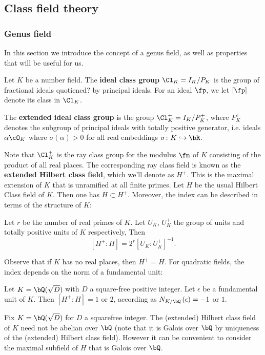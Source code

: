 \subsection{Class field theory}
\subsubsection{Genus field}

In this section we introduce the concept of a genus field, as well as properties that will be useful for us.

Let $K$ be a number field. The \textbf{ideal class group} $\Cl_K = I_K / P_K$ is the group of fractional ideals quotiened{\color{red}?} by principal ideals.
For an ideal $\fp$, we let $[\fp]$ denote its class in $\Cl_K$.

The \textbf{extended ideal class group} is the group $\Cl_K^{+} = I_K / P_K^{+}$, where
$P_K^{+}$ denotes the subgroup of principal ideals with totally positive generator, i.e. ideals $\alpha \cO_K$ where $\sigma(\alpha) > 0$ for all real embeddings $\sigma \colon K \emb \bR$.

Note that $\Cl_K^{+}$ is the ray class group for the modulus $\fm$ of $K$ consisting of the product of all real places. The corresponding ray class field is known as the \textbf{extended Hilbert class field}, which we'll denote as $H^{+}$. This is the maximal extension of $K$ that is unramified at all finite primes. Let $H$ be the usual Hilbert Class field of $K$. Then one has $H \subset H^{+}$. Moreover, the index can be described in terms of the structure of $K$:

\begin{thm}\cite[Chapter VI, Section 3, Theorem 3.1]{Janusz}
    Let $r$ be the number of real primes of $K$. Let $U_K$, $U_K^{+}$ the group of units and totally positive units of $K$ respectively, Then 
    \[ [H^{+} \colon H] = 2^r [U_K \colon U_K^{+}]^{-1} .\]
\end{thm}
Observe that if $K$ has no real places, then $H^{+} = H$. For quadratic fields, the index depends on the norm of a fundamental unit:

\begin{cor}
    Let $K = \bQ(\sqrt{D})$ with $D$ a square-free positive integer. Let $\epsilon$ be a fundamental unit of $K$. Then $[H^{+} \colon H] = 1$ or $2$, according as $N_{K / \bQ}\left(\epsilon\right) = -1$ or $1$. 
\end{cor}


Fix $K = \bQ(\sqrt{D})$ for $D$ a squarefree integer. The (extended) Hilbert class field of $K$ need not be abelian over $\bQ$ (note that it is Galois over $\bQ$ by uniqueness of the (extended) Hilbert class field). However it can be convenient to consider the maximal subfield of $H$ that is Galois over $\bQ$. 

